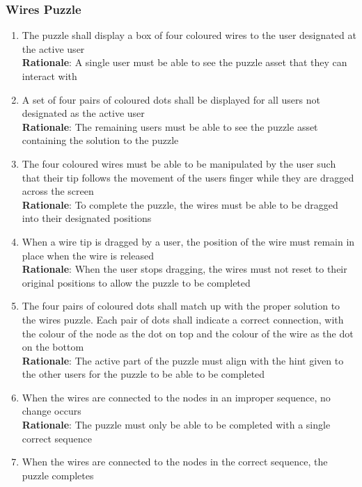 \documentclass[12pt]{article}
\begin{document}
\subsubsection{Wires Puzzle}

\begin{enumerate}[label=WP\arabic*., series=WiresPuzzle ]
        \item The puzzle shall display a box of four coloured wires to the user designated at the active user \\
        \textbf{Rationale}: A single user must be able to see the puzzle asset that they can interact with
        \item A set of four pairs of coloured dots shall be displayed for all users not designated as the active user \\
        \textbf{Rationale}: The remaining users must be able to see the puzzle asset containing the solution to the puzzle
        \item The four coloured wires must be able to be manipulated by the user such that their tip follows the movement of the users finger while they are dragged across the screen \\
        \textbf{Rationale}: To complete the puzzle, the wires must be able to be dragged into their designated positions
        \item When a wire tip is dragged by a user, the position of the wire must remain in place when the wire is released \\
        \textbf{Rationale}: When the user stops dragging, the wires must not reset to their original positions to allow the puzzle to be completed
        \item  The four pairs of coloured dots shall match  up with the proper solution to the wires puzzle. Each pair of dots shall indicate a correct connection, with the colour of the node as the dot on top and the colour of the wire as the dot on the bottom\\
        \textbf{Rationale}: The active part of the puzzle must align with the hint given to the other users for the puzzle to be able to be completed 
        \item  When the wires are connected to the nodes in an improper sequence, no change occurs \\
        \textbf{Rationale}: The puzzle must only be able to be completed with a single correct sequence
        \item  When the wires are connected to the nodes in the correct sequence, the puzzle completes \\

\end{enumerate}
\end{document}
